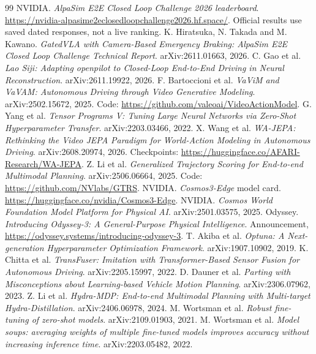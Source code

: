 \documentclass{article}
\begin{document}
\begin{thebibliography}{99}
 NVIDIA. \emph{AlpaSim E2E Closed Loop Challenge 2026 leaderboard}. \url{https://nvidia-alpasime2eclosedloopchallenge2026.hf.space/}. Official results use saved dated responses, not a live ranking.
 K. Hiratsuka, N. Takada and M. Kawano. \emph{GatedVLA with Camera-Based Emergency Braking: AlpaSim E2E Closed Loop Challenge Technical Report}. arXiv:2611.01663, 2026.
 C. Gao et al. \emph{Lao Siji: Adapting openpilot to Closed-Loop End-to-End Driving in Neural Reconstruction}. arXiv:2611.19922, 2026.
 F. Bartoccioni et al. \emph{VaViM and VaVAM: Autonomous Driving through Video Generative Modeling}. arXiv:2502.15672, 2025. Code: \url{https://github.com/valeoai/VideoActionModel}.
 G. Yang et al. \emph{Tensor Programs V: Tuning Large Neural Networks via Zero-Shot Hyperparameter Transfer}. arXiv:2203.03466, 2022.
 X. Wang et al. \emph{WA-JEPA: Rethinking the Video JEPA Paradigm for World-Action Modeling in Autonomous Driving}. arXiv:2608.20974, 2026. Checkpoints: \url{https://huggingface.co/AFARI-Research/WA-JEPA}.
 Z. Li et al. \emph{Generalized Trajectory Scoring for End-to-end Multimodal Planning}. arXiv:2506.06664, 2025. Code: \url{https://github.com/NVlabs/GTRS}.
 NVIDIA. \emph{Cosmos3-Edge} model card. \url{https://huggingface.co/nvidia/Cosmos3-Edge}.
 NVIDIA. \emph{Cosmos World Foundation Model Platform for Physical AI}. arXiv:2501.03575, 2025.
 Odyssey. \emph{Introducing Odyssey-3: A General-Purpose Physical Intelligence}. Announcement, \url{https://odyssey.systems/introducing-odyssey-3}.
 T. Akiba et al. \emph{Optuna: A Next-generation Hyperparameter Optimization Framework}. arXiv:1907.10902, 2019.
 K. Chitta et al. \emph{TransFuser: Imitation with Transformer-Based Sensor Fusion for Autonomous Driving}. arXiv:2205.15997, 2022.
 D. Dauner et al. \emph{Parting with Misconceptions about Learning-based Vehicle Motion Planning}. arXiv:2306.07962, 2023.
 Z. Li et al. \emph{Hydra-MDP: End-to-end Multimodal Planning with Multi-target Hydra-Distillation}. arXiv:2406.06978, 2024.
 M. Wortsman et al. \emph{Robust fine-tuning of zero-shot models}. arXiv:2109.01903, 2021.
 M. Wortsman et al. \emph{Model soups: averaging weights of multiple fine-tuned models improves accuracy without increasing inference time}. arXiv:2203.05482, 2022.

\end{thebibliography}
\end{document}

